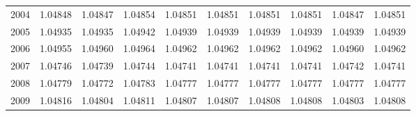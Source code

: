 \begin{tabular}{cccccccccc}
  2004 & 1.04848 & 1.04847 & 1.04854 & 1.04851 & 1.04851 & 1.04851 & 1.04851 & 1.04847 & 1.04851 \\ 
  2005 & 1.04935 & 1.04935 & 1.04942 & 1.04939 & 1.04939 & 1.04939 & 1.04939 & 1.04939 & 1.04939 \\ 
  2006 & 1.04955 & 1.04960 & 1.04964 & 1.04962 & 1.04962 & 1.04962 & 1.04962 & 1.04960 & 1.04962 \\ 
  2007 & 1.04746 & 1.04739 & 1.04744 & 1.04741 & 1.04741 & 1.04741 & 1.04741 & 1.04742 & 1.04741 \\ 
  2008 & 1.04779 & 1.04772 & 1.04783 & 1.04777 & 1.04777 & 1.04777 & 1.04777 & 1.04777 & 1.04777 \\ 
  2009 & 1.04816 & 1.04804 & 1.04811 & 1.04807 & 1.04807 & 1.04808 & 1.04808 & 1.04803 & 1.04808 \\ 
   \hline
\end{tabular}
